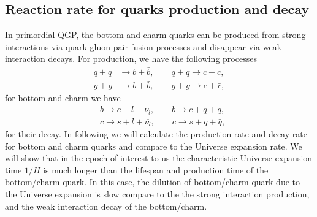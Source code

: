 \subsection{Reaction rate for quarks production and decay}
In primordial QGP, the bottom and charm quarks can be produced from strong interactions via quark-gluon pair fusion processes and disappear via weak interaction decays. For production, we have the following processes
\begin{align}
 q+\bar{q}&\longrightarrow b+\bar b,\qquad q+\bar{q}\longrightarrow c+\bar c,\\
 g+g&\longrightarrow b+\bar b,\qquad g+g\longrightarrow c+\bar c,
\end{align}
for bottom and charm we have
\begin{align}
 &b\longrightarrow c+l+\overline{\nu_l}, \qquad b\longrightarrow c+q+\bar{q},\\
&c\longrightarrow s+l+\overline{\nu_l},\qquad c\longrightarrow s+q+\bar{q},
\end{align}
for their decay. In following we will calculate the production rate and decay rate for bottom and charm quarks and compare to the Universe expansion rate. We will show that in the epoch of interest to us the characteristic Universe expansion time $1/H$ is much longer than the lifespan and production time of the bottom/charm quark. In this case, the dilution of bottom/charm quark due to the Universe expansion is slow compare to the the strong interaction production, and the weak interaction decay of the bottom/charm. 
 




